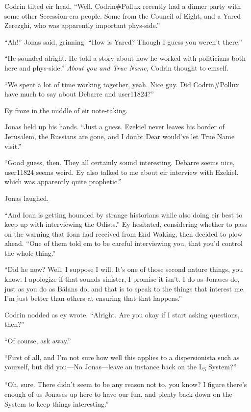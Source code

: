 Codrin tilted eir head. ``Well, Codrin\#Pollux recently had a dinner party with some other Secession-era people. Some from the Council of Eight, and a Yared Zerezghi, who was apparently important phys-side.''

``Ah!'' Jonas said, grinning. ``How is Yared? Though I guess you weren't there.''

``He sounded alright. He told a story about how he worked with politicians both here and phys-side.'' \emph{About you and True Name,} Codrin thought to emself.

``We spent a lot of time working together, yeah. Nice guy. Did Codrin\#Pollux have much to say about Debarre and user11824?''

Ey froze in the middle of eir note-taking.

Jonas held up his hands. ``Just a guess. Ezekiel never leaves his border of Jerusalem, the Russians are gone, and I doubt Dear would've let True Name visit.''

``Good guess, then. They all certainly sound interesting. Debarre seems nice, user11824 seems weird. Ey also talked to me about eir interview with Ezekiel, which was apparently quite prophetic.''

Jonas laughed.

``And Ioan is getting hounded by strange historians while also doing eir best to keep up with interviewing the Odists.'' Ey hesitated, considering whether to pass on the warning that Ioan had received from End Waking, then decided to plow ahead. ``One of them told em to be careful interviewing you, that you'd control the whole thing.''

``Did he now? Well, I suppose I will. It's one of those second nature things, you know. I apologize if that sounds sinister, I promise it isn't. I do as Jonases do, just as you do as Bălans do, and that is to speak to the things that interest me. I'm just better than others at ensuring that that happens.''

Codrin nodded as ey wrote. ``Alright. Are you okay if I start asking questions, then?''

``Of course, ask away.''

``First of all, and I'm not sure how well this applies to a dispersionista such as yourself, but did you---No Jonas---leave an instance back on the L\textsubscript{5} System?''

``Oh, sure. There didn't seem to be any reason not to, you know? I figure there's enough of us Jonases up here to have our fun, and plenty back down on the System to keep things interesting.''

